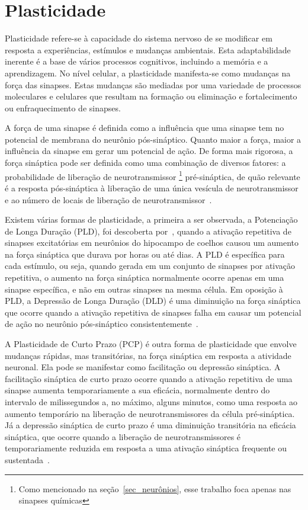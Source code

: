 \section{Plasticidade}

Plasticidade refere-se à capacidade do sistema nervoso de se modificar em resposta a experiências, estímulos e mudanças
ambientais. Esta adaptabilidade inerente é a base de vários processos cognitivos, incluindo a memória e a aprendizagem. No nível
celular, a plasticidade manifesta-se como mudanças na força das sinapses. Estas mudanças são mediadas por uma variedade de
processos moleculares e celulares que resultam na formação ou eliminação e fortalecimento ou enfraquecimento de sinapses.

A força de uma sinapse é definida como a influência que uma sinapse tem no potencial de membrana do neurônio pós-sináptico. Quanto
maior a força, maior a influência da sinapse em gerar um potencial de ação. De forma mais rigorosa, a força sináptica pode ser
definida como uma combinação de diversos fatores: a probabilidade de liberação de neurotransmissor
\footnote{Como mencionado na seção~\ref{sec_neurônios}, esse trabalho foca apenas nas sinapses químicas}
pré-sináptica, de quão relevante é a resposta pós-sináptica à liberação de uma única vesícula de neurotransmissor e ao número de
locais de liberação de neurotransmissor~\cite{fattSpontaneous1952}. 

Existem várias formas de plasticidade, a primeira a ser observada, a Potenciação de Longa Duração (PLD), foi descoberta
por~\cite{blissLonglasting1973}, quando a ativação repetitiva de sinapses excitatórias em neurônios do hipocampo de coelhos causou
um aumento na força sináptica que durava por horas ou até dias. A PLD é específica para cada estímulo, ou seja, quando gerada em
um conjunto de sinapses por ativação repetitiva, o aumento na força sináptica normalmente ocorre apenas em uma sinapse específica,
e não em outras sinapses na mesma célula. Em oposição à PLD, a Depressão de Longa Duração (DLD) é uma diminuição na força
sináptica que ocorre quando a ativação repetitiva de sinapses falha em causar um potencial de ação no neurônio pós-sináptico
consistentemente~\cite{dudekHomosynaptic1992}. 

A Plasticidade de Curto Prazo (PCP) é outra forma de plasticidade que envolve mudanças rápidas, mas transitórias, na força
sináptica em resposta a atividade neuronal. Ela pode se manifestar como facilitação ou depressão sináptica. A facilitação
sináptica de curto prazo ocorre quando a ativação repetitiva de uma sinapse aumenta temporariamente a sua eficácia, normalmente
dentro do intervalo de milissegundos a, no máximo, alguns minutos, como uma resposta ao aumento temporário na liberação de
neurotransmissores da célula pré-sináptica. Já a depressão sináptica de curto prazo é uma diminuição transitória na eficácia
sináptica, que ocorre quando a liberação de neurotransmissores é temporariamente reduzida em resposta a uma ativação sináptica
frequente ou sustentada~\cite{zuckerShortTerm2002}.

